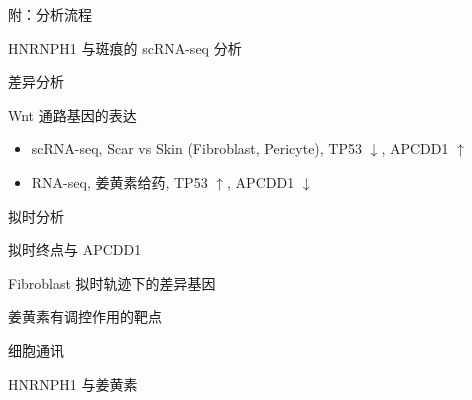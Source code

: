\documentclass[
  ignorenonframetext,
]{beamer}
\providecommand{\tightlist}{%
  \setlength{\itemsep}{0pt}\setlength{\parskip}{0pt}}
\begin{document}
\begin{frame}{附：分析流程}
\begin{block}{HNRNPH1 与斑痕的 scRNA-seq 分析}
\begin{block}{差异分析}
\begin{block}{Wnt 通路基因的表达}
\protect\hypertarget{wnt-ux901aux8defux57faux56e0ux7684ux8868ux8fbe}{}
\begin{itemize}
\tightlist
\item
  scRNA-seq, Scar vs Skin (Fibroblast, Pericyte), TP53 \(\downarrow\),
  APCDD1 \(\uparrow\)
\item
  RNA-seq, 姜黄素给药, TP53 \(\uparrow\), APCDD1 \(\downarrow\)
\end{itemize}
\end{block}
\end{block}

\begin{block}{拟时分析}
\protect\hypertarget{ux62dfux65f6ux5206ux6790}{}
\begin{block}{拟时终点与 APCDD1}
\protect\hypertarget{ux62dfux65f6ux7ec8ux70b9ux4e0e-apcdd1}{}
\end{block}

\begin{block}{Fibroblast 拟时轨迹下的差异基因}
\protect\hypertarget{fibroblast-ux62dfux65f6ux8f68ux8ff9ux4e0bux7684ux5deeux5f02ux57faux56e0}{}
\end{block}

\begin{block}{姜黄素有调控作用的靶点}
\protect\hypertarget{ux59dcux9ec4ux7d20ux6709ux8c03ux63a7ux4f5cux7528ux7684ux9776ux70b9}{}
\end{block}
\end{block}

\begin{block}{细胞通讯}
\protect\hypertarget{ux7ec6ux80deux901aux8baf}{}
\end{block}
\end{block}

\begin{block}{HNRNPH1 与姜黄素}
\protect\hypertarget{hnrnph1-ux4e0eux59dcux9ec4ux7d20}{}
\end{block}
\end{frame}
\end{document}
